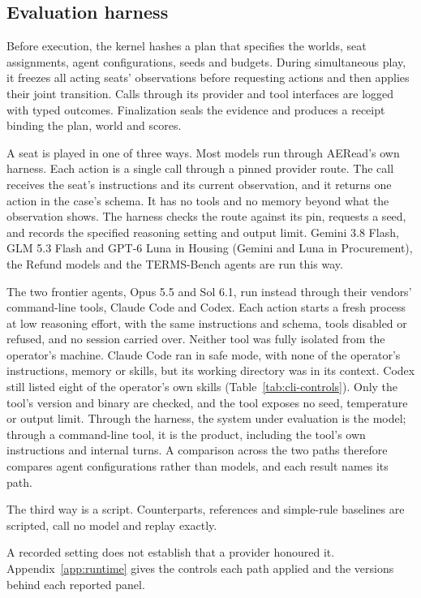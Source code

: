 \subsection{Evaluation harness}
Before execution, the kernel hashes a plan that specifies the worlds, seat
assignments, agent configurations, seeds and budgets. During simultaneous
play, it freezes all acting seats' observations before requesting actions
and then applies their joint transition. Calls through its provider and
tool interfaces are logged with typed outcomes. Finalization seals the
evidence and produces a receipt binding the plan, world and scores.

A seat is played in one of three ways. Most models run through AERead's
own harness. Each action is a single call through a pinned provider route.
The call receives the seat's instructions and its current observation, and it
returns one action in the case's schema. It has no tools and no memory beyond
what the observation shows. The harness checks the route against its pin, requests a
seed, and records the specified reasoning setting and output limit.
Gemini 3.8 Flash, GLM 5.3 Flash and GPT-6 Luna in Housing (Gemini and Luna
in Procurement), the Refund models and the TERMS-Bench agents are run this
way.

The two frontier agents, Opus 5.5 and Sol 6.1, run instead through
their vendors' command-line tools, Claude Code and Codex. Each action starts a fresh process
at low reasoning effort, with the same instructions and schema, tools
disabled or refused, and no session carried over. Neither tool was fully
isolated from the operator's machine. Claude Code ran in safe mode, with none
of the operator's instructions, memory or skills, but its working directory
was in its context. Codex still listed eight of the operator's own skills
(Table~\ref{tab:cli-controls}). Only the tool's version
and binary are checked, and the tool exposes no seed, temperature or output
limit. Through the harness, the system under evaluation is the model; through a
command-line tool, it is the product, including the tool's own instructions and
internal turns. A comparison across the two paths therefore compares agent
configurations rather than models, and each result names its path.

The third way is a script. Counterparts, references and simple-rule baselines
are scripted, call no model and replay exactly.

A recorded setting does not establish that a provider honoured it.
Appendix~\ref{app:runtime} gives the controls each path applied and the
versions behind each reported panel.
